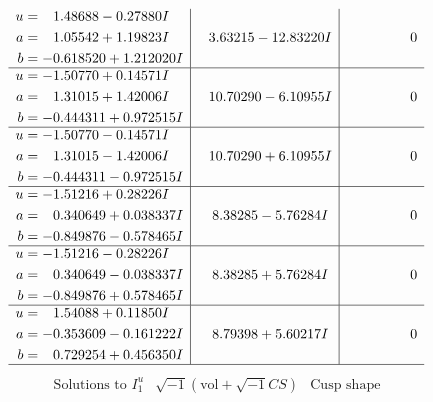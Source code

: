 \documentclass[1p]{elsarticle_modified}
\theoremstyle{definition}
\newcommand{\I}{\sqrt{-1}}
\begin{document}
$$\begin{array}{c|c|c}
\begin{aligned}
u &= \phantom{-}1.48688 - 0.27880 I \\
a &= \phantom{-}1.05542 + 1.19823 I \\
b &= -0.618520 + 1.212020 I\end{aligned}
 & \phantom{-}3.63215 - 12.83220 I & \phantom{-0.000000 } 0 \\ \hline\begin{aligned}
u &= -1.50770 + 0.14571 I \\
a &= \phantom{-}1.31015 + 1.42006 I \\
b &= -0.444311 + 0.972515 I\end{aligned}
 & \phantom{-}10.70290 - 6.10955 I & \phantom{-0.000000 } 0 \\ \hline\begin{aligned}
u &= -1.50770 - 0.14571 I \\
a &= \phantom{-}1.31015 - 1.42006 I \\
b &= -0.444311 - 0.972515 I\end{aligned}
 & \phantom{-}10.70290 + 6.10955 I & \phantom{-0.000000 } 0 \\ \hline\begin{aligned}
u &= -1.51216 + 0.28226 I \\
a &= \phantom{-}0.340649 + 0.038337 I \\
b &= -0.849876 - 0.578465 I\end{aligned}
 & \phantom{-}8.38285 - 5.76284 I & \phantom{-0.000000 } 0 \\ \hline\begin{aligned}
u &= -1.51216 - 0.28226 I \\
a &= \phantom{-}0.340649 - 0.038337 I \\
b &= -0.849876 + 0.578465 I\end{aligned}
 & \phantom{-}8.38285 + 5.76284 I & \phantom{-0.000000 } 0 \\ \hline\begin{aligned}
u &= \phantom{-}1.54088 + 0.11850 I \\
a &= -0.353609 - 0.161222 I \\
b &= \phantom{-}0.729254 + 0.456350 I\end{aligned}
 & \phantom{-}8.79398 + 5.60217 I & \phantom{-0.000000 } 0\\
 \hline 
 \end{array}$$\newpage$$\begin{array}{c|c|c}  
\text{Solutions to }I^u_{1}& \I (\text{vol} + \sqrt{-1}CS) & \text{Cusp shape}\\
 \hline 
\begin{aligned}

\end{aligned}
\end{array}$$
\end{document}
